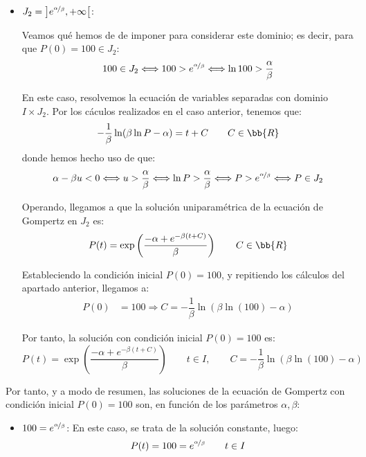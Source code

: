 \begin{ejercicio}
\begin{itemize}
        \item \ul{$J_2=\left]e^{\nicefrac{\alpha}{\beta}}, +\infty\right[$}:
        
        Veamos qué hemos de de imponer para considerar este dominio; es decir, para que $P(0)=100\in J_2$:
        \begin{equation*}
            100\in J_2 \Longleftrightarrow 100>e^{\nicefrac{\alpha}{\beta}} \Longleftrightarrow \ln 100 > \dfrac{\alpha}{\beta}
        \end{equation*}

        En este caso, resolvemos la ecuación de variables separadas con dominio $I\times J_2$.
        Por los cáculos realizados en el caso anterior, tenemos que:
        \begin{equation*}
            -\dfrac{1}{\beta} \ln(\beta \ln P-\alpha) = t + C \qquad C\in \bb{R}
        \end{equation*}
        donde hemos hecho uso de que:
        \begin{equation*}
            \alpha-\beta u<0\Longleftrightarrow
            u>\dfrac{\alpha}{\beta}\Longleftrightarrow
            \ln P>\dfrac{\alpha}{\beta}\Longleftrightarrow
            P>e^{\nicefrac{\alpha}{\beta}} \Longleftrightarrow P\in J_2
        \end{equation*}

        Operando, llegamos a que la solución uniparamétrica de la ecuación de Gompertz en $J_2$ es:
        \begin{equation*}
            P(t) = \exp\left(\dfrac{-\alpha + e^{-\beta(t + C)}}{\beta}\right) \qquad C\in \bb{R}
        \end{equation*}

        Estableciendo la condición inicial $P(0)=100$, y repitiendo los cálculos del apartado anterior, llegamos a:
        \begin{align*}
            P(0) &= 100 \Longrightarrow C=-\dfrac{1}{\beta}\ln(\beta\ln(100)-\alpha)
        \end{align*}

        Por tanto, la solución con condición inicial $P(0)=100$ es:
        \begin{equation*}
            P(t) = \exp\left(\dfrac{-\alpha + e^{-\beta(t + C)}}{\beta}\right) \qquad t\in I, \qquad C=-\dfrac{1}{\beta}\ln(\beta\ln(100)-\alpha)
        \end{equation*}
    \end{itemize}

    Por tanto, y a modo de resumen, las soluciones de la ecuación de Gompertz con condición inicial $P(0)=100$ son, en función de los parámetros $\alpha, \beta$:
    \begin{itemize}
        \item \ul{$100=e^{\nicefrac{\alpha}{\beta}}$}: En este caso, se trata de la solución constante, luego:
        \begin{equation*}
            P(t) = 100 = e^{\nicefrac{\alpha}{\beta}} \qquad t\in I
        \end{equation*}


\end{itemize}
\end{ejercicio}
